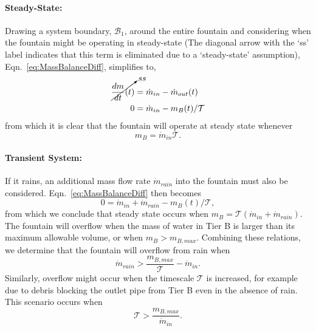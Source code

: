\paragraph{Steady-State:}
Drawing a system boundary, $\mathcal{B}_1$, around the entire fountain and considering when the fountain might be operating in steady-state (The diagonal arrow with the `ss' label indicates that this term is eliminated due to a `steady-state' assumption), Eqn.~\eqref{eq:MassBalanceDiff}, simplifies to,
\begin{equation}
\begin{split}
\cancelto{ss}{\frac{dm}{dt}(t)} &= \dot{m}_{in} - \dot{m}_{out}(t) \\
0 &= \dot{m}_{in} -  m_B(t)/\mathcal{T}
\end{split}
\end{equation}
from which it is clear that the fountain will operate at steady state whenever 
\begin{equation}\label{eq:SS_mB}
m_{B} = \dot{m}_{in}\mathcal{T}. 
\end{equation}
\paragraph{Transient System:}
If it rains, an additional mass flow rate $\dot{m}_{rain}$ into the fountain must also be considered. Eqn.~\eqref{eq:MassBalanceDiff} then becomes
\begin{equation}
0 = \dot{m}_{in} + \dot{m}_{rain}-  m_B(t)/\mathcal{T},
\end{equation}
from which we conclude that steady state occurs when $m_B= \mathcal{T}(\dot{m}_{in}+\dot{m}_{rain})$. The fountain will overflow when the mass of water in Tier B is larger than its maximum allowable volume, or when $m_B > m_{B,max}$. Combining these relations, we determine that the fountain will overflow from rain when
\begin{equation}
\dot{m}_{rain} > \frac{m_{B,max}}{\mathcal{T}} -\dot{m}_{in}.
\end{equation}
Similarly, overflow might occur when the timescale $\mathcal{T}$ is increased, for example due to debris blocking the outlet pipe from Tier B even in the absence of rain. This scenario occurs when
\begin{equation}
\mathcal{T}>  \frac{m_{B,max}}{\dot{m}_{in}}.
\end{equation}

